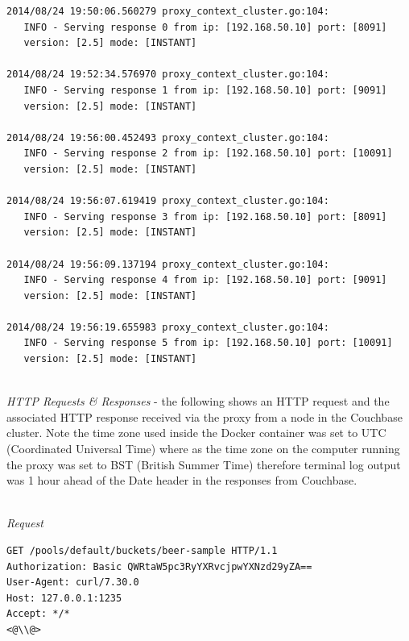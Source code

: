 \documentclass[a4paper,11pt,twoside]{article}
\begin{document}

\begin{lstlisting}[language=terminal]
2014/08/24 19:50:06.560279 proxy_context_cluster.go:104:     
   INFO - Serving response 0 from ip: [192.168.50.10] port: [8091] 
   version: [2.5] mode: [INSTANT]

2014/08/24 19:52:34.576970 proxy_context_cluster.go:104:     
   INFO - Serving response 1 from ip: [192.168.50.10] port: [9091] 
   version: [2.5] mode: [INSTANT]

2014/08/24 19:56:00.452493 proxy_context_cluster.go:104:     
   INFO - Serving response 2 from ip: [192.168.50.10] port: [10091] 
   version: [2.5] mode: [INSTANT]

2014/08/24 19:56:07.619419 proxy_context_cluster.go:104:     
   INFO - Serving response 3 from ip: [192.168.50.10] port: [8091] 
   version: [2.5] mode: [INSTANT]

2014/08/24 19:56:09.137194 proxy_context_cluster.go:104:     
   INFO - Serving response 4 from ip: [192.168.50.10] port: [9091] 
   version: [2.5] mode: [INSTANT]

2014/08/24 19:56:19.655983 proxy_context_cluster.go:104:     
   INFO - Serving response 5 from ip: [192.168.50.10] port: [10091] 
   version: [2.5] mode: [INSTANT]
\end{lstlisting}

\noindent\\
\textit{HTTP Requests \& Responses} - the following shows an HTTP request and the associated HTTP response received via the proxy from a node in the Couchbase cluster.  Note the time zone used inside the Docker container was set to UTC (Coordinated Universal Time) where as the time zone on the computer running the proxy was set to BST (British Summer Time) therefore terminal log output was 1 hour ahead of the Date header in the responses from Couchbase.

\noindent\\
\textit{Request}
\begin{lstlisting}[language=terminal]
GET /pools/default/buckets/beer-sample HTTP/1.1
Authorization: Basic QWRtaW5pc3RyYXRvcjpwYXNzd29yZA==
User-Agent: curl/7.30.0
Host: 127.0.0.1:1235
Accept: */*
<@\\@>
\end{lstlisting}
\end{document}
